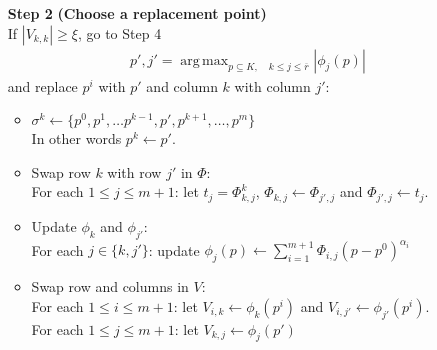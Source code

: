 \documentclass{article}
\theoremstyle{case}
\DeclareMathOperator*{\argmax}{arg\,max}
\begin{document}
\begin{algorithm}[H]
\begin{itemize}
        \item[\textbf{Step 2}] \textbf{(Choose a replacement point)} \\
        	If $|V_{k,k}| \ge \xi$, go to Step 4 \\
\begin{align*}
p', j' = \argmax_{p \subseteq K, \quad k \le j \le \overline{r}} |\phi_j(p) |
\end{align*}
			and replace $p^i$ with $p'$ and column $k$ with column $j'$:
			\begin{itemize}
				\item $\sigma^{k} \gets \{p^0, p^1, \ldots p^{k-1}, p', p^{k+1}, \ldots, p^m\}$ \\
					In other words $p^k \gets p'$.
				\item Swap row $k$ with row $j'$ in $\Phi$: \\
					For each $1 \le j \le m+1$: let $t_j = \Phi^k_{k, j}$, $\Phi_{k, j} \gets \Phi_{j', j}$ and $\Phi_{j', j} \gets t_j$.
				\item Update $\phi_k$ and $\phi_{j'}$: \\
					For each $j \in \{k, j'\}$: update $\phi_j(p) \gets \sum_{i=1}^{m+1} \Phi_{i, j} (p - p^0)^{\alpha_i}$
				\item Swap row and columns in $V$:\\
					For each $1 \le i \le m+1$: let $V_{i, k} \gets \phi_k(p^i)$ and $V_{i, j'} \gets \phi_{j'}(p^i)$.\\ 
					For each $1 \le j \le m+1$: let $V_{k, j} \gets \phi_j(p')$
			\end{itemize}
        	

\end{itemize}
\end{algorithm}
\end{document}
